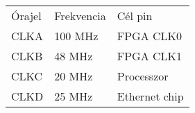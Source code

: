 \documentclass[11pt,magyar,a4paper,oneside,]{report}
\begin{document}
\begin{longtable}[c]{@{}lll@{}}
\toprule\addlinespace
\begin{minipage}[b]{0.09\columnwidth}\raggedright
Órajel
\end{minipage} & \begin{minipage}[b]{0.14\columnwidth}\raggedright
Frekvencia
\end{minipage} & \begin{minipage}[b]{0.16\columnwidth}\raggedright
Cél pin
\end{minipage}
\\\addlinespace
\midrule\endhead
\begin{minipage}[t]{0.09\columnwidth}\raggedright
CLKA
\end{minipage} & \begin{minipage}[t]{0.14\columnwidth}\raggedright
100 MHz
\end{minipage} & \begin{minipage}[t]{0.16\columnwidth}\raggedright
FPGA CLK0
\end{minipage}
\\\addlinespace
\begin{minipage}[t]{0.09\columnwidth}\raggedright
CLKB
\end{minipage} & \begin{minipage}[t]{0.14\columnwidth}\raggedright
48 MHz
\end{minipage} & \begin{minipage}[t]{0.16\columnwidth}\raggedright
FPGA CLK1
\end{minipage}
\\\addlinespace
\begin{minipage}[t]{0.09\columnwidth}\raggedright
CLKC
\end{minipage} & \begin{minipage}[t]{0.14\columnwidth}\raggedright
20 MHz
\end{minipage} & \begin{minipage}[t]{0.16\columnwidth}\raggedright
Processzor
\end{minipage}
\\\addlinespace
\begin{minipage}[t]{0.09\columnwidth}\raggedright
CLKD
\end{minipage} & \begin{minipage}[t]{0.14\columnwidth}\raggedright
25 MHz
\end{minipage} & \begin{minipage}[t]{0.16\columnwidth}\raggedright
Ethernet chip
\end{minipage}

\end{longtable}
\end{document}
